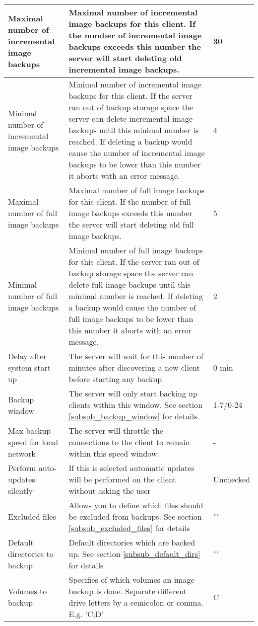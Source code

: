 \documentclass[a4paper,10pt]{article} \usepackage[breaklinks=true]{hyperref}
\begin{document}
\begin{longtable}{|p{}|p{}|p{}|}
\hline
Maximal number of incremental image backups & Maximal number of incremental image backups for this client. If the number of incremental image backups exceeds this number the server will start deleting old incremental image backups. & 30\\
\hline
Minimal number of incremental image backups & Minimal number of incremental image backups for this client. If the server ran out of backup storage space the server can delete incremental image backups until this minimal number is reached. If deleting a backup would cause the number of incremental image backups to be lower than this number it aborts with an error message. & 4\\
\hline
Maximal number of full image backups & Maximal number of full image backups for this client. If the number of
 full image backups exceeds this number the server will start deleting old full image backups. & 5\\
\hline
Minimal number of full image backups & Minimal number of full image backups for this client. If the server ran out of backup storage space the server can delete full image backups until this minimal number is reached. If deleting a backup would cause the number of full image backups to be lower than this number it aborts with an error message. & 2\\
\hline
Delay after system start up & The server will wait for this number of minutes after discovering a new client before starting any backup & 0 min\\
\hline
Backup window & The server will only start backing up clients within this window. See section \ref{subsub_backup_window} for details. & 1-7/0-24\\
\hline
Max backup speed for local network & The server will throttle the connections to the client to remain within this speed window. & -\\
\hline
Perform auto-updates silently & If this is selected automatic updates will be performed on the client without asking the user & Unchecked\\
\hline
Excluded files & Allows you to define which files should be excluded from backups. See section \ref{subsub_excluded_files} for details & "" \\
\hline
Default directories to backup & Default directories which are backed up. See section \ref{subsub_default_dirs} for details & ""\\
\hline
Volumes to backup & Specifies of which volumes an image backup is done. Separate different drive letters by a semicolon or comma. E.g. 'C;D' & C \\

\end{longtable}
\end{document}
